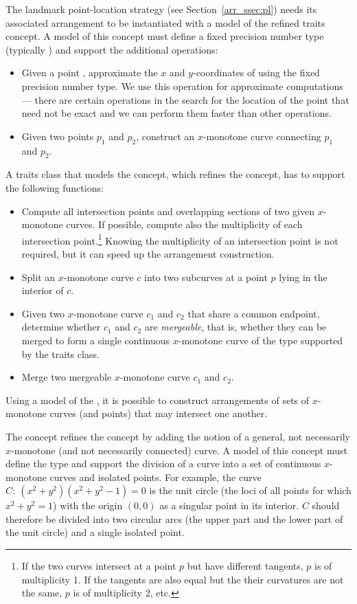 The landmark point-location strategy (see
Section~\ref{arr_ssec:pl}) needs its associated arrangement to be
instantiated with a model of the refined
 traits concept. A model of this
concept must define a fixed precision number type (typically
) and support the additional operations:
\begin{itemize}
\item Given a point , approximate the $x$ and $y$-coordinates
of  using the fixed precision number type. We use this operation
for approximate computations --- there are certain operations in the
search for the location of the point that need not be exact and we can
perform them faster than other operations. 
\item Given two points $p_1$ and $p_2$, construct an $x$-monotone
curve connecting $p_1$ and $p_2$.
\end{itemize}

A traits class that models the 
concept, which refines the 
concept, has to support the following functions:
\begin{itemize}
\item Compute all intersection points and overlapping sections of
two given $x$-monotone curves. If possible, compute also the
multiplicity of each intersection point.\footnote{If the two
curves intersect at a point $p$ but have different tangents, $p$
is of multiplicity 1. If the tangents are also equal but the their
curvatures are not the same, $p$ is of multiplicity 2, etc.}
Knowing the multiplicity of an intersection point is not required,
but it can speed up the arrangement construction.
\item Split an $x$-monotone curve $c$ into two subcurves at a point
$p$ lying in the interior of $c$.
\item Given two $x$-monotone curve $c_1$ and $c_2$ that share a
common endpoint, determine whether $c_1$ and $c_2$ are {\em
mergeable}, that is, whether they can be merged to form a
single continuous $x$-monotone curve of the type supported by the
traits class.
\item Merge two mergeable $x$-monotone curve $c_1$ and $c_2$.
\end{itemize}
Using a model of the , it is
possible to construct arrangements of sets of $x$-monotone curves
(and points) that may intersect one another.

The concept  refines the
 concept by adding the notion
of a general, not necessarily $x$-monotone (and not necessarily
connected) curve. A model of this concept must define the
 type and support the division of a curve into a
set of continuous $x$-monotone curves and isolated points. For
example, the curve $C:\ (x^2 + y^2)(x^2 + y^2 - 1) = 0$ is the
unit circle (the loci of all points for which $x^2 + y^2  = 1$)
with the origin $(0,0)$ as a singular point in its interior. $C$
should therefore be divided into two circular arcs (the upper
part and the lower part of the unit circle) and a single isolated
point.

